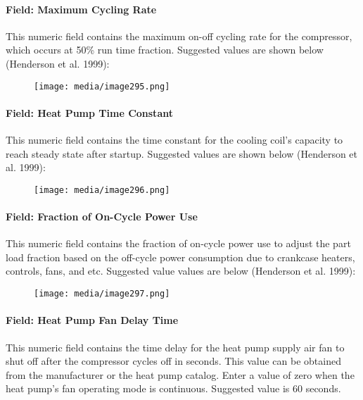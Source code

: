\paragraph{Field: Maximum Cycling Rate}\label{field-maximum-cycling-rate-001}

This numeric field contains the maximum on-off cycling rate for the compressor, which occurs at 50\% run time fraction. Suggested values are shown below (Henderson et al. 1999):

\begin{figure}[htbp]
\centering
\texttt{[image: media/image295.png]}
\caption{}
\end{figure}

\paragraph{Field: Heat Pump Time Constant}\label{field-heat-pump-time-constant-000}

This numeric field contains the time constant for the cooling coil's capacity to reach steady state after startup. Suggested values are shown below (Henderson et al. 1999):

\begin{figure}[htbp]
\centering
\texttt{[image: media/image296.png]}
\caption{}
\end{figure}

\paragraph{Field: Fraction of On-Cycle Power Use}\label{field-fraction-of-on-cycle-power-use-000}

This numeric field contains the fraction of on-cycle power use to adjust the part load fraction based on the off-cycle power consumption due to crankcase heaters, controls, fans, and etc. Suggested value values are below (Henderson et al. 1999):

\begin{figure}[htbp]
\centering
\texttt{[image: media/image297.png]}
\caption{}
\end{figure}

\paragraph{Field: Heat Pump Fan Delay Time}\label{field-heat-pump-fan-delay-time-000}

This numeric field contains the time delay for the heat pump supply air fan to shut off after the compressor cycles off in seconds. This value can be obtained from the manufacturer or the heat pump catalog. Enter a value of zero when the heat pump's fan operating mode is continuous. Suggested value is 60 seconds.

